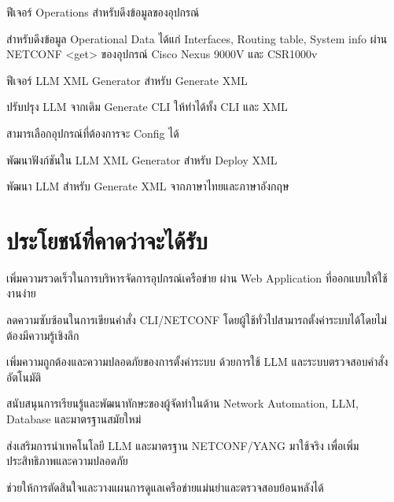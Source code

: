 \begin{mycustomenum2}
    \item ฟีเจอร์ Operations สำหรับดึงข้อมูลของอุปกรณ์
    \begin{mycustomenum2}
        \item สำหรับดึงข้อมูล Operational Data ได้แก่ Interfaces, Routing table, System info ผ่าน NETCONF <get> ของอุปกรณ์ Cisco Nexus 9000V และ CSR1000v
    \end{mycustomenum2}

    \item ฟีเจอร์ LLM XML Generator สำหรับ Generate XML
    \begin{mycustomenum2}
        \item ปรับปรุง LLM จากเดิม Generate CLI ให้ทำได้ทั้ง CLI และ XML
        \item สามารเลือกอุปกรณ์ที่ต้องการจะ Config ได้
        \item พัฒนาฟังก์ชันใน LLM XML Generator สำหรับ Deploy XML
        \item พัฒนา LLM สำหรับ Generate XML จากภาษาไทยและภาษาอังกฤษ
    \end{mycustomenum2}
    
\end{mycustomenum2}
\section{ประโยชน์ที่คาดว่าจะได้รับ}

\begin{mycustomenum}[label=1.4.\arabic*] %
    \item เพิ่มความรวดเร็วในการบริหารจัดการอุปกรณ์เครือข่าย ผ่าน Web Application ที่ออกแบบให้ใช้งานง่าย
    \item ลดความซับซ้อนในการเขียนคำสั่ง CLI/NETCONF โดยผู้ใช้ทั่วไปสามารถตั้งค่าระบบได้โดยไม่ต้องมีความรู้เชิงลึก 
    \item เพิ่มความถูกต้องและความปลอดภัยของการตั้งค่าระบบ ด้วยการใช้ LLM และระบบตรวจสอบคำสั่งอัตโนมัติ  
    \item สนับสนุนการเรียนรู้และพัฒนาทักษะของผู้จัดทำในด้าน Network Automation, LLM, Database และมาตรฐานสมัยใหม่
    \item ส่งเสริมการนำเทคโนโลยี LLM และมาตรฐาน NETCONF/YANG มาใช้จริง เพื่อเพิ่มประสิทธิภาพและความปลอดภัย  
    \item ช่วยให้การตัดสินใจและวางแผนการดูแลเครือข่ายแม่นยำและตรวจสอบย้อนหลังได้ 
\end{mycustomenum}
